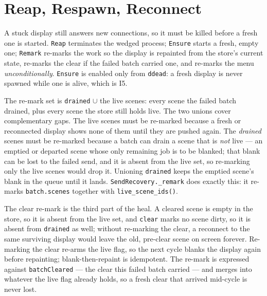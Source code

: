 \documentclass[a4paper,10pt,fleqn]{article}
\begin{document}
\section{Reap, Respawn, Reconnect}

A stuck display still answers new connections, so it must be killed before
a fresh one is started.  \texttt{Reap} terminates the wedged process;
\texttt{Ensure} starts a fresh, empty one; \texttt{Remark} re-marks the work
so the display is repainted from the store's current state, re-marks the
clear if the failed batch carried one, and re-marks the menu
\emph{unconditionally}.  \texttt{Ensure} is enabled only from
\texttt{ddead}: a fresh display is never spawned while one is alive, which is
I5.

The re-mark set is \texttt{drained} $\cup$ the live scenes: every scene the
failed batch drained, plus every scene the store still holds live.  The two
unions cover complementary gaps.  The live scenes must be re-marked because a
fresh or reconnected display shows none of them until they are pushed again.
The \emph{drained} scenes must be re-marked because a batch can drain a scene
that is \emph{not} live --- an emptied or departed scene whose only remaining
job is to be blanked; that blank can be lost to the failed send, and it is
absent from the live set, so re-marking only the live scenes would drop it.
Unioning \texttt{drained} keeps the emptied scene's blank in the queue until
it lands.  \texttt{SendRecovery.\_remark} does exactly this: it re-marks
\texttt{batch.scenes} together with \texttt{live\_scene\_ids()}.

The clear re-mark is the third part of the heal.  A cleared scene is empty in
the store, so it is absent from the live set, and \texttt{clear} marks no
scene dirty, so it is absent from \texttt{drained} as well; without re-marking
the clear, a reconnect to the same surviving display would leave the old,
pre-clear scene on screen forever.  Re-marking the clear re-arms the live
flag, so the next cycle blanks the display again before repainting;
blank-then-repaint is idempotent.  The re-mark is expressed against
\texttt{batchCleared} --- the clear this failed batch carried --- and merges
into whatever the live flag already holds, so a fresh clear that arrived
mid-cycle is never lost.
\end{document}
